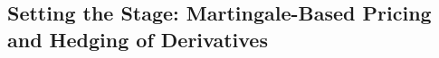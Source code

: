 


\subsection{Setting the Stage: Martingale-Based Pricing and Hedging of Derivatives} \label{subsection:theoreticalhedging}
